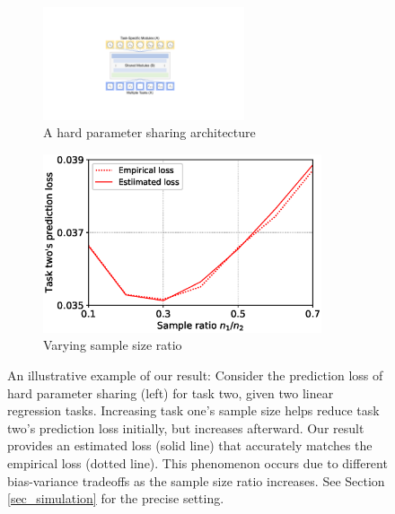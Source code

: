 \begin{figure}[!t]
	\begin{subfigure}[b]{0.5\textwidth}
		\centering
		\includegraphics[width=0.65\textwidth]{figures/mtl_model.pdf}
		\caption{A hard parameter sharing architecture}
	\end{subfigure}\hfill
	\begin{subfigure}[b]{0.5\textwidth}
		\centering
		\includegraphics[width=0.9\textwidth]{figures/sample_ratio_c2_400.eps}
		\caption{Varying sample size ratio}
		\label{fig_intro_sample_size_b}
	\end{subfigure}
	\caption{An illustrative example of our result:
	Consider the prediction loss of hard parameter sharing (left) for task two, given two linear regression tasks.
	Increasing task one's sample size helps reduce task two's prediction loss initially, but increases afterward. Our result provides an estimated loss (solid line) that accurately matches the empirical loss (dotted line). This phenomenon occurs due to different bias-variance tradeoffs as the sample size ratio increases.
	See Section \ref{sec_simulation} for the precise setting.}
	\label{fig_intro_sample_size}
\end{figure}

